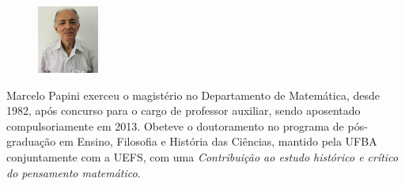 \documentclass{hipatia}
\begin{document}


\nocite{*}







\vspace{1cm}
\begin{figure}
	\vspace{-10pt}
	\centering
	\includegraphics[width=2cm]{papini.jpg}
\end{figure}\noindent
Marcelo Papini 
exerceu o magistério no Departamento de Matemática, desde 1982,  após concurso para o cargo de professor auxiliar, sendo aposentado compulsoriamente em 2013. Obeteve o doutoramento no programa de pós-graduação em Ensino, Filosofia e História das Ciências, mantido pela UFBA conjuntamente com a UEFS, com uma \emph{Contribuição ao estudo histórico e crítico do pensamento matemático}.
\end{document}
